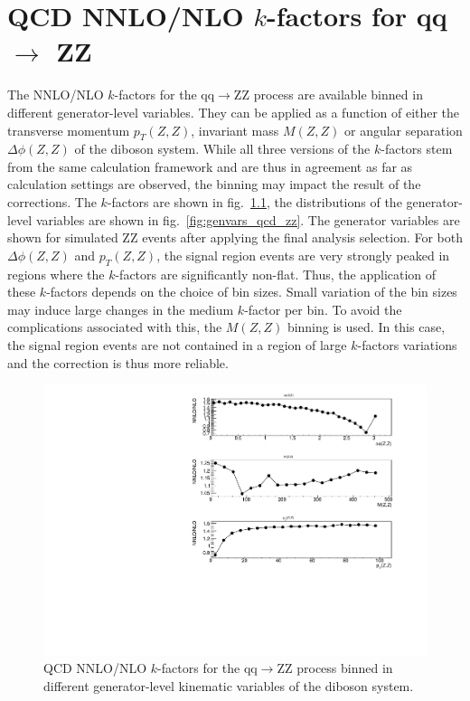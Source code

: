 \chapter{QCD NNLO/NLO $k$-factors for qq $\rightarrow$ ZZ}
\label{app:kfactor_qcd_zz}

The NNLO/NLO $k$-factors for the qq$\rightarrow$ZZ process are available binned in different generator-level variables.
They can be applied as a function of either the transverse momentum $p_{T}(Z,Z)$,
invariant mass $M(Z,Z)$ or angular separation $\Delta\phi(Z,Z)$ of the diboson system.
While all three versions of the $k$-factors stem from the same calculation framework and are thus in agreement as far
as calculation settings are observed, the binning may impact the result of the corrections.
The $k$-factors are shown in fig.~\ref{fig:kfactor_qcd_zz}, the distributions of the generator-level variables are shown in fig.~\ref{fig:genvars_qcd_zz}.
The generator variables are shown for simulated ZZ events after applying the final analysis selection.
For both $\Delta\phi(Z,Z)$ and $p_{T}(Z,Z)$, the signal region events are very strongly peaked in regions where the $k$-factors are significantly non-flat.
Thus, the application of these $k$-factors depends on the choice of bin sizes. Small variation of the bin sizes may induce large changes in the medium
$k$-factor per bin. To avoid the complications associated with this, the $M(Z,Z)$ binning is used. In this case, the signal region events are not contained in a
region of large $k$-factors variations and the correction is thus more reliable.

\begin{figure}[htbp]
\begin{center}
\includegraphics[width=\textwidth]{figures/kfactors.pdf}
\caption{QCD NNLO/NLO $k$-factors for the qq$\rightarrow$ZZ process binned in different generator-level kinematic variables of the diboson system.
}
\label{fig:kfactor_qcd_zz}
\end{center}
\end{figure}

